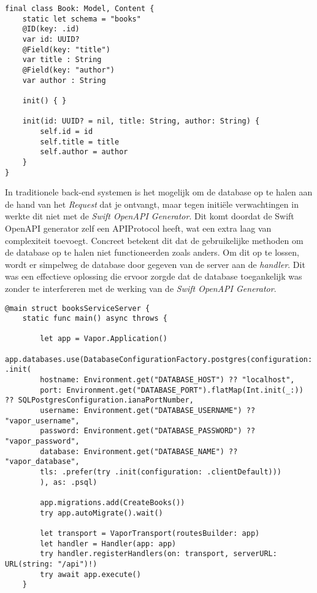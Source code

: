 \begin{lstlisting}[caption=Model file]
final class Book: Model, Content {
    static let schema = "books"
    @ID(key: .id)
    var id: UUID?
    @Field(key: "title")
    var title : String
    @Field(key: "author")
    var author : String
    
    init() { }
    
    init(id: UUID? = nil, title: String, author: String) {
        self.id = id
        self.title = title
        self.author = author
    }
}
\end{lstlisting}

In traditionele back-end systemen is het mogelijk om de database op te halen aan de hand van het \textit{Request} dat je ontvangt, maar tegen initiële verwachtingen in werkte dit niet met de \textit{Swift OpenAPI Generator}. Dit komt doordat de Swift OpenAPI generator zelf een APIProtocol heeft, wat een extra laag van complexiteit toevoegt. Concreet betekent dit dat de gebruikelijke methoden om de database op te halen niet functioneerden zoals anders. Om dit op te lossen, wordt er simpelweg de database door gegeven van de server aan de \textit{handler}. Dit was een effectieve oplossing die ervoor zorgde dat de database toegankelijk was zonder te interfereren met de werking van de \textit{Swift OpenAPI Generator}.

\begin{lstlisting}[caption=booksServiceServer file]
@main struct booksServiceServer {
    static func main() async throws {
        
        let app = Vapor.Application()
        app.databases.use(DatabaseConfigurationFactory.postgres(configuration: .init(
        hostname: Environment.get("DATABASE_HOST") ?? "localhost",
        port: Environment.get("DATABASE_PORT").flatMap(Int.init(_:)) ?? SQLPostgresConfiguration.ianaPortNumber,
        username: Environment.get("DATABASE_USERNAME") ?? "vapor_username",
        password: Environment.get("DATABASE_PASSWORD") ?? "vapor_password",
        database: Environment.get("DATABASE_NAME") ?? "vapor_database",
        tls: .prefer(try .init(configuration: .clientDefault)))
        ), as: .psql)
        
        app.migrations.add(CreateBooks())
        try app.autoMigrate().wait()
        
        let transport = VaporTransport(routesBuilder: app)
        let handler = Handler(app: app)
        try handler.registerHandlers(on: transport, serverURL: URL(string: "/api")!)
        try await app.execute()
    }

\end{lstlisting}

